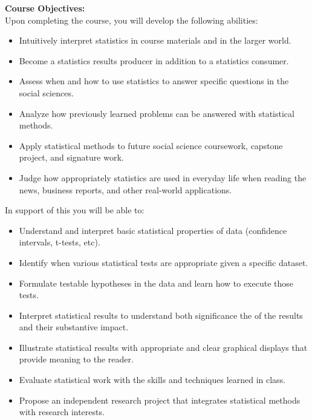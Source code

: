 \documentclass[11pt]{article}
\begin{document}
\vspace{0.5cm}
\large \textbf{Course Objectives:}\\[0.5em]
Upon completing the course, you will develop the following abilities:
\begin{itemize}
    \item Intuitively interpret statistics in course materials and in the larger world.
    \item Become a statistics results producer in addition to a statistics consumer.
    \item Assess when and how to use statistics to answer specific questions in the social sciences.
    \item Analyze how previously learned problems can be answered with statistical methods.
    \item Apply statistical methods to future social science coursework, capstone project, and signature work.
    \item Judge how appropriately statistics are used in everyday life when reading the news, business reports, and other real-world applications.
\end{itemize}

In support of this you will be able to:
\begin{itemize}
    \item Understand and interpret basic statistical properties of data (confidence intervals, t-tests, etc).
    \item Identify when various statistical tests are appropriate given a specific dataset.
    \item Formulate testable hypotheses in the data and learn how to execute those tests.
    \item Interpret statistical results to understand both significance the of the results and their substantive impact.
    \item Illustrate statistical results with appropriate and clear graphical displays that provide meaning to the reader.
    \item Evaluate statistical work with the skills and techniques learned in class.
    \item Propose an independent research project that integrates statistical methods with research interests.
\end{itemize}
\end{document}
